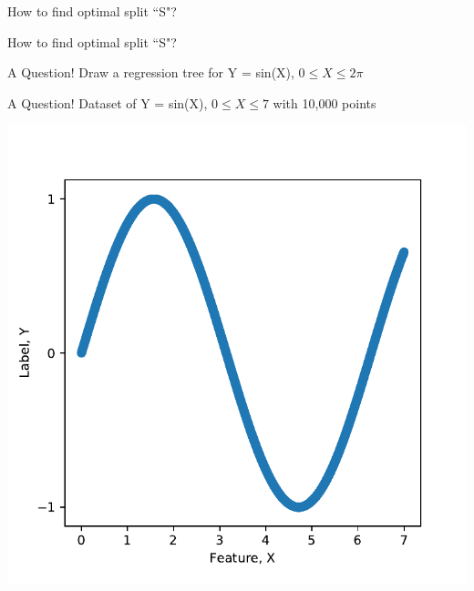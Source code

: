 \documentclass{beamer}
\begin{document}
	\begin{frame}{How to find optimal split ``S"?}
	\end{frame}


	\begin{frame}{How to find optimal split ``S"?}
	\begin{enumerate}
	\end{enumerate} 
	\end{frame}

	\begin{frame}{A Question!}
	Draw a regression tree for Y = sin(X), $0 \leq X \leq 2\pi$ 
	\end{frame}

	\begin{frame}{A Question!}
	Dataset of Y = sin(X), $0 \leq X \leq 7$ with 10,000 points 
	\begin{center}
	\includegraphics[scale=0.5]{sine-dataset}
	\end{center}
	\end{frame}
\end{document}
